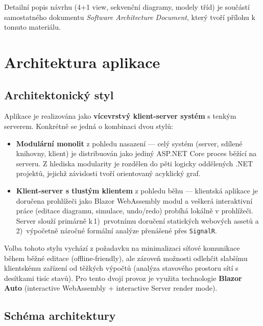 \documentclass[12pt,a4paper]{article}
\begin{document}
Detailní popis návrhu (4+1 view, sekvenční diagramy, modely tříd) je
součástí samostatného dokumentu \emph{Software Architecture Document},
který tvoří přílohu k tomuto materiálu.

\section{Architektura aplikace}
\label{sec:arch}

\subsection{Architektonický styl}

Aplikace je realizována jako \textbf{vícevrstvý klient-server systém}
s tenkým serverem. Konkrétně se jedná o kombinaci dvou stylů:

\begin{itemize}
    \item \textbf{Modulární monolit} z pohledu nasazení — celý systém
          (server, sdílené knihovny, klient) je distribuován jako jediný
          ASP.NET Core proces běžící na serveru. Z hlediska modularity
          je rozdělen do pěti logicky oddělených .NET projektů, jejichž
          závislosti tvoří orientovaný acyklický graf.
    \item \textbf{Klient-server s tlustým klientem} z pohledu běhu —
          klientská aplikace je doručena prohlížeči jako Blazor
          WebAssembly modul a veškerá interaktivní práce (editace
          diagramu, simulace, undo/redo) probíhá lokálně v prohlížeči.
          Server slouží primárně k\,1)~prvotnímu doručení statických
          webových assetů a\,2)~výpočetně náročné formální analýze
          přenášené přes \texttt{SignalR}.
\end{itemize}

Volba tohoto stylu vychází z požadavku na minimalizaci síťové komunikace
během běžné editace (offline-friendly), ale zároveň možnosti odlehčit
slabšímu klientskému zařízení od těžkých výpočtů (analýza stavového
prostoru sítí s desítkami tisíc stavů). Pro tento dvojí provoz je
využita technologie \textbf{Blazor Auto} (interactive WebAssembly +
interactive Server render mode).

\subsection{Schéma architektury}
\end{document}
